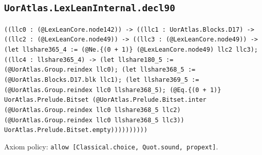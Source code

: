 \documentclass[11pt]{article}
\begin{document}
\subsection*{\texttt{UorAtlas.LexLeanInternal.decl90}}
\noindent\texttt{((llc0 : (@LexLeanCore.node142)) -> ((llc1 : UorAtlas.Blocks.D17) -> ((llc2 : (@LexLeanCore.node49)) -> ((llc3 : (@LexLeanCore.node49)) -> (let llshare365\_4 := (@Ne.\{(0 + 1)\} (@LexLeanCore.node49) llc2 llc3); ((llc4 : llshare365\_4) -> (let llshare180\_5 := (@UorAtlas.Group.reindex llc0); (let llshare368\_5 := (@UorAtlas.Blocks.D17.blk llc1); (let llshare369\_5 := (@UorAtlas.Group.reindex llc0 llshare368\_5); (@Eq.\{(0 + 1)\} UorAtlas.Prelude.Bitset (@UorAtlas.Prelude.Bitset.inter (@UorAtlas.Group.reindex llc0 llshare368\_5 llc2) (@UorAtlas.Group.reindex llc0 llshare368\_5 llc3)) UorAtlas.Prelude.Bitset.empty))))))))))}\par
\noindent Axiom policy: \texttt{allow [Classical.choice, Quot.sound, propext]}.\par
\end{document}
